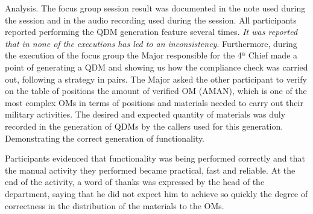 \documentclass[twocolumn]{bmcart}%
\begin{document}

Analysis. The focus group session result was documented in the note used during the session and in the audio recording used during the session. All participants reported performing the QDM generation feature several times. \emph{It was reported that in none of the executions has led to an inconsistency}. Furthermore, during the execution of the focus group the Major responsible for the 4ª Chief made a point of generating a QDM and showing us how the compliance check was carried out, following a strategy in pairs. The Major asked the other participant to verify on the table of positions the amount of verified OM (AMAN), which is one of the most complex OMs in terms of positions and materials needed to carry out their military activities. The desired and expected quantity of materials was duly recorded in the generation of QDMs by the callers used for this generation. Demonstrating the correct generation of functionality.


Participants evidenced that functionality was being performed correctly and that the manual activity they performed became practical, fast and reliable. At the end of the activity, a word of thanks was expressed by the head of the department, saying that he did not expect him to achieve so quickly the degree of correctness in the distribution of the materials to the OMs.
\end{document}
